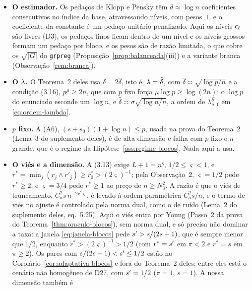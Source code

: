 \documentclass[11pt,a4paper]{article}
\newcommand{\lamGone}{\lambda^{\mathcal{G}}_{n,1}}
\begin{document}
\begin{itemize}[leftmargin=*]
  \item \textbf{O estimador.} Os pedaços de Klopp e Pensky têm
    $d \approx \log n$ coeficientes consecutivos no índice da base,
    atravessando níveis, com pesos~$1$, e o coeficiente da constante é um
    pedaço unitário penalizado. Aqui os níveis $c_{\ell}$ são livres (D3), os
    pedaços finos ficam dentro de um nível e os níveis grossos formam um
    pedaço por bloco, e os pesos são de razão limitada, o que cobre os
    $\sqrt{|G|}$ do \texttt{grpreg} (Proposição~\ref{prop:balanceada}(iii)) e
    a variante branca (Observação~\ref{rem:branca}).
  \item \textbf{O $\lambda$.} O Teorema~2 deles usa $\delta = 2\widehat\delta$,
    isto é, $\lambda = \widehat\delta$, com $\widehat\delta \asymp
    \sqrt{\log p/n}$ e a condição (3.16), $p^{\mu} \ge 2n$, que com $p$ fixo
    força $\mu\log p \ge \log(2n)$: o $\log p$ do enunciado esconde um
    $\log n$, e $\widehat\delta \asymp \sigma\sqrt{\log n/n}$, a ordem de
    $\lamGone$ em \eqref{eq:ordem-lambda}.
  \item \textbf{$p$ fixo.} A (A6), $(s+s_{0})(1+\log n) \le p$, usada na
    prova do Teorema~2 (Lema~3 do suplemento deles), é de alta dimensão e
    falha com $p$ fixo e $n$ grande, que é o regime da
    Hipótese~\ref{ass:regime-blocos}. Nada aqui a usa.
  \item \textbf{O viés e a dimensão.} A (3.13) exige $L + 1 = n^{\varsigma}$,
    $1/2 \le \varsigma < 1$, e $r^{*} = \min_{j}(r_{j}\wedge r'_{j}) \ge
    r_{0}^{*} > (2\varsigma)^{-1}$; pela Observação~2, $\varsigma = 1/2$ pede
    $r^{*} \ge 2$, e $\varsigma = 3/4$ pede $r^{*} \ge 1$ ao preço de
    $n \ge N_{3}^{2}$. A razão é que o viés de truncamento,
    $C_{a}^{2}s\,n^{-2r^{*}\varsigma}$, é levado à ordem paramétrica
    $C_{a}^{2}s/n$, e o termo de viés no ajuste é controlado pela norma dual,
    como o de ruído (Lema~2 do suplemento deles, eq.~5.25). Aqui o viés entra
    por Young (Passo~2 da prova do Teorema~\ref{thm:oraculo-blocos}), sem
    norma dual, e só precisa não dominar a taxa: a janela
    \eqref{eq:janela-blocos} pede $s' > s/(2s+1)$, que é sempre menor que
    $1/2$, enquanto $r^{*} > (2\varsigma)^{-1} > 1/2$ (com $r^{*} = s'$ em
    $\pi < 2$ e $r^{*} = s$ em $\pi \ge 2$). Os pares com
    $s/(2s+1) < s' \le 1/2$ estão no Corolário~\ref{cor:adaptativa-blocos}
    e fora do Teorema~2 deles; entre eles está o cenário não homogêneo de D27,
    com $s' = 1/2$ ($\pi = 1$, $s = 1$). A nossa dimensão também é

\end{itemize}
\end{document}
